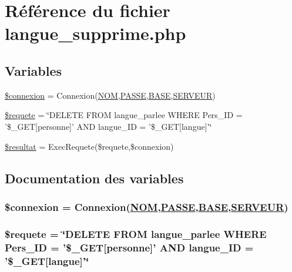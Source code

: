 \hypertarget{langue__supprime_8php}{
\section{R\'{e}f\'{e}rence du fichier langue\_\-supprime.php}
\label{langue__supprime_8php}
}
\subsection*{Variables}
\begin{CompactItemize}
\item 
\hyperlink{langue__supprime_8php_a0}{\$connexion} = Connexion(\hyperlink{pma__connect_8php_a0}{NOM},\hyperlink{pma__connect_8php_a1}{PASSE},\hyperlink{pma__connect_8php_a3}{BASE},\hyperlink{pma__connect_8php_a2}{SERVEUR})
\item 
\hyperlink{langue__supprime_8php_a1}{\$requete} = \char`\"{}DELETE FROM langue\_\-parlee WHERE Pers\_\-ID = '\$\_\-GET\mbox{[}personne\mbox{]}' AND langue\_\-ID = '\$\_\-GET\mbox{[}langue\mbox{]}'\char`\"{}
\item 
\hyperlink{langue__supprime_8php_a2}{\$resultat} = Exec\-Requete(\$requete,\$connexion)
\end{CompactItemize}


\subsection{Documentation des variables}
\hypertarget{langue__supprime_8php_a0}{
\subsubsection[\$connexion]{\setlength{\rightskip}{0pt plus 5cm}\$connexion = Connexion(\hyperlink{pma__connect_8php_a0}{NOM},\hyperlink{pma__connect_8php_a1}{PASSE},\hyperlink{pma__connect_8php_a3}{BASE},\hyperlink{pma__connect_8php_a2}{SERVEUR})}}
\label{langue__supprime_8php_a0}


\hypertarget{langue__supprime_8php_a1}{
\subsubsection[\$requete]{\setlength{\rightskip}{0pt plus 5cm}\$requete = \char`\"{}DELETE FROM langue\_\-parlee WHERE Pers\_\-ID = '\$\_\-GET\mbox{[}personne\mbox{]}' AND langue\_\-ID = '\$\_\-GET\mbox{[}langue\mbox{]}'\char`\"{}}}
\label{langue__supprime_8php_a1}


